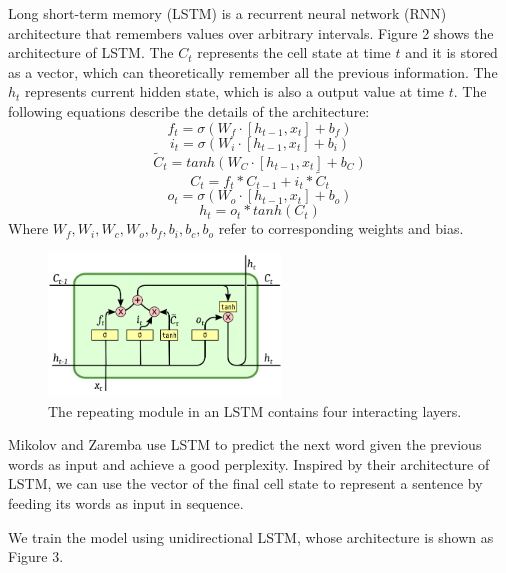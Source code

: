 \documentclass{sig-alternate}
\begin{document}
Long short-term memory (LSTM) is a recurrent neural network (RNN) architecture 
that remembers values over arbitrary intervals. Figure 2 shows the architecture 
of LSTM. The $C_t$ represents the cell state at time $t$ and it is stored as a 
vector, which can theoretically remember all the previous information. The 
$h_t$ represents current hidden state, which is also a output value at time 
$t$. The following equations describe the details of the architecture:
\begin{equation}
   f_t = \sigma(W_f \cdot [h_{t-1}, x_t] + b_f)
\end{equation}
\begin{equation}
   i_t = \sigma(W_i \cdot [h_{t-1}, x_t] + b_i)
\end{equation}
\begin{equation}
   \tilde{C}_t = tanh(W_C \cdot [h_{t-1}, x_t] + b_C) 
\end{equation}
\begin{equation}
   C_t = f_t * C_{t-1} + i_t * \tilde{C}_t
\end{equation}
\begin{equation}
   o_t = \sigma(W_o \cdot [h_{t-1}, x_t] + b_o)
\end{equation}
\begin{equation}
   h_t = o_t * tanh(C_t)
\end{equation}
Where $W_f, W_i, W_c, W_o, b_f, b_i, b_c, b_o$ refer to corresponding weights and bias.
\begin{figure}
  \centering
  \includegraphics[height=1.5in, width=2.44in]{lstm2.png}
  \caption{The repeating module in an LSTM contains four interacting layers.}
\end{figure}

Mikolov\cite{Mikolov2} and Zaremba\cite{Zaremba} use LSTM to predict the next 
word given the previous words as input and achieve a good perplexity. Inspired 
by their architecture of LSTM, we can use the vector of the final cell state to 
represent a sentence by feeding its words as input in sequence.

We train the model using unidirectional LSTM, whose architecture is shown as 
Figure 3. 
\end{document}
